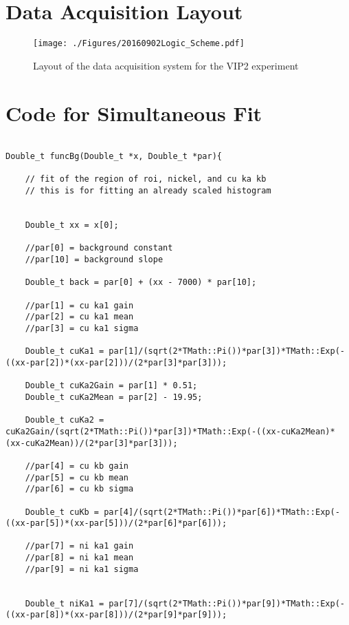 \begin{appendices}
\chapter{Data Acquisition Layout}


\begin{figure}[h]
 \centering
 \texttt{[image: ./Figures/20160902Logic\_Scheme.pdf]}
 \caption{Layout of the data acquisition system for the VIP2 experiment}
 \label{fig:logic_scheme}
\end{figure}

\chapter{Code for Simultaneous Fit}
\label{chap:simCode}

\begin{lstlisting}
 
Double_t funcBg(Double_t *x, Double_t *par){
    
    // fit of the region of roi, nickel, and cu ka kb
    // this is for fitting an already scaled histogram
    
    
    Double_t xx = x[0];
    
    //par[0] = background constant
    //par[10] = background slope
    
    Double_t back = par[0] + (xx - 7000) * par[10];
    
    //par[1] = cu ka1 gain
    //par[2] = cu ka1 mean
    //par[3] = cu ka1 sigma
    
    Double_t cuKa1 = par[1]/(sqrt(2*TMath::Pi())*par[3])*TMath::Exp(-((xx-par[2])*(xx-par[2]))/(2*par[3]*par[3]));
    
    Double_t cuKa2Gain = par[1] * 0.51;
    Double_t cuKa2Mean = par[2] - 19.95;
    
    Double_t cuKa2 = cuKa2Gain/(sqrt(2*TMath::Pi())*par[3])*TMath::Exp(-((xx-cuKa2Mean)*(xx-cuKa2Mean))/(2*par[3]*par[3]));
    
    //par[4] = cu kb gain
    //par[5] = cu kb mean
    //par[6] = cu kb sigma
    
    Double_t cuKb = par[4]/(sqrt(2*TMath::Pi())*par[6])*TMath::Exp(-((xx-par[5])*(xx-par[5]))/(2*par[6]*par[6]));
    
    //par[7] = ni ka1 gain
    //par[8] = ni ka1 mean
    //par[9] = ni ka1 sigma
  
    
    Double_t niKa1 = par[7]/(sqrt(2*TMath::Pi())*par[9])*TMath::Exp(-((xx-par[8])*(xx-par[8]))/(2*par[9]*par[9]));
    

\end{lstlisting}
\end{appendices}
